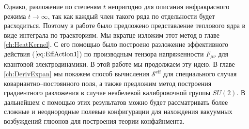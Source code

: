 Однако, разложение по степеням $t$ непригодно для описания инфракрасного режима $t\to\infty$, так как каждый член такого ряда по отдельности будет расходиться. Поэтому в работе \cite{Mnev} было предложено представление теплового ядра в виде интеграла по траекториям. Мы вкратце изложим этот метод в главе \ref{ch:HeatKernel}. С его помощью было построено разложение эффективного действия ($\ref{eq:EffAction1}$) по производным тензора напряженности $F_{\mu \nu}$ для квантовой электродинамики.  В этой работе мы продолжаем эту идею. В главе \ref{ch:DerivExpan} мы покажем способ вычисления $\mathcal{S}^\text{eff}$ для специального случая ковариантно--постоянного поля, а также предложим метод построения  градиентного разложения в случае неабелевой калибровочной группы $SU(2)$. В дальнейшем с помощью этих результатов можно будет рассматривать более сложные и неоднородные полевые конфигурации для нахождения вакуумных возбуждений глюонов для построения теории конфайнмента.